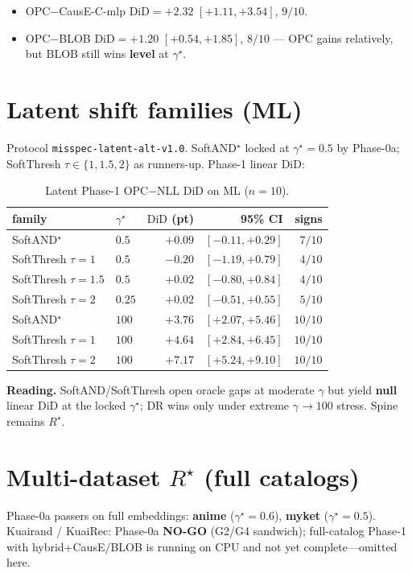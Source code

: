 \documentclass[11pt,a4paper]{article}
\newcommand{\Rstar}{R^{\star}}
\newcommand{\gstar}{\gamma^{\star}}
\newcommand{\DiD}{\mathrm{DiD}}
\begin{document}
\begin{itemize}[leftmargin=1.2em]
  \item OPC$-$CausE-C-mlp \(\DiD{=}+2.32\) \([+1.11,+3.54]\), \(9/10\).
  \item OPC$-$BLOB \(\DiD{=}+1.20\) \([+0.54,+1.85]\), \(8/10\) --- OPC gains
        relatively, but BLOB still wins \textbf{level} at \(\gstar\).
\end{itemize}

\section{Latent shift families (ML)}
Protocol \texttt{misspec-latent-alt-v1.0}. SoftAND\(^\star\) locked at \(\gstar{=}0.5\) by Phase-0a;
SoftThresh \(\tau\in\{1,1.5,2\}\) as runners-up. Phase-1 linear DiD:

\begin{table}[h]
\centering
\caption{Latent Phase-1 OPC$-$NLL DiD on ML (\(n{=}10\)).}
\begin{tabular}{llrrr}
\toprule
family & \(\gstar\) & \(\DiD\) (pt) & 95\% CI & signs \\
\midrule
SoftAND\(^\star\) & \(0.5\) & \(+0.09\) & \([-0.11,+0.29]\) & \(7/10\) \\
SoftThresh \(\tau{=}1\) & \(0.5\) & \(-0.20\) & \([-1.19,+0.79]\) & \(4/10\) \\
SoftThresh \(\tau{=}1.5\) & \(0.5\) & \(+0.02\) & \([-0.80,+0.84]\) & \(4/10\) \\
SoftThresh \(\tau{=}2\) & \(0.25\) & \(+0.02\) & \([-0.51,+0.55]\) & \(5/10\) \\
\midrule
SoftAND\(^\star\) & \(100\) & \(+3.76\) & \([+2.07,+5.46]\) & \(10/10\) \\
SoftThresh \(\tau{=}1\) & \(100\) & \(+4.64\) & \([+2.84,+6.45]\) & \(10/10\) \\
SoftThresh \(\tau{=}2\) & \(100\) & \(+7.17\) & \([+5.24,+9.10]\) & \(10/10\) \\
\bottomrule
\end{tabular}
\end{table}

\noindent
\textbf{Reading.} SoftAND/SoftThresh open oracle gaps at moderate \(\gamma\) but yield
\textbf{null} linear DiD at the locked \(\gstar\); DR wins only under extreme
\(\gamma{\to}100\) stress. Spine remains \(\Rstar\).

\section{Multi-dataset \(\Rstar\) (full catalogs)}
Phase-0a passers on full embeddings: \textbf{anime} (\(\gstar{=}0.6\)), \textbf{myket} (\(\gstar{=}0.5\)).
Kuairand / KuaiRec: Phase-0a \textbf{NO-GO} (G2/G4 sandwich); full-catalog Phase-1 with hybrid+CausE/BLOB
is running on CPU and not yet complete---omitted here.
\end{document}

